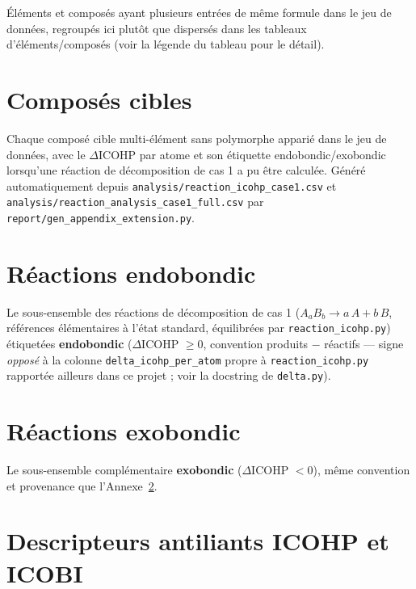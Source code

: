 \documentclass[11pt,a4paper]{article}
\begin{document}
Éléments et composés ayant plusieurs entrées de même formule dans le
jeu de données, regroupés ici plutôt que dispersés dans les tableaux
d'éléments/composés (voir la légende du tableau pour le détail).

{\small

}

\section{Composés cibles}
\label{sec:appendix-ext-compounds}

Chaque composé cible multi-élément sans polymorphe apparié dans le jeu
de données, avec le $\Delta$ICOHP par atome et son étiquette
endobondic/exobondic lorsqu'une réaction de décomposition de cas 1 a pu
être calculée. Généré automatiquement depuis
\texttt{analysis/reaction\_icohp\_case1.csv} et
\texttt{analysis/reaction\_analysis\_case1\_full.csv} par
\texttt{report/gen\_appendix\_extension.py}.

{\small

}

\section{Réactions endobondic}
\label{sec:appendix-ext-endobondic}

Le sous-ensemble des réactions de décomposition de cas 1
($A_aB_b \to a\,A + b\,B$, références élémentaires à l'état standard,
équilibrées par \texttt{reaction\_icohp.py}) étiquetées
\textbf{endobondic} ($\Delta$ICOHP $\geq 0$, convention produits $-$
réactifs --- signe \emph{opposé} à la colonne
\texttt{delta\_icohp\_per\_atom} propre à \texttt{reaction\_icohp.py}
rapportée ailleurs dans ce projet ; voir la docstring de
\texttt{delta.py}).

{\small

}

\section{Réactions exobondic}
\label{sec:appendix-ext-exobondic}

Le sous-ensemble complémentaire \textbf{exobondic} ($\Delta$ICOHP $< 0$),
même convention et provenance que l'Annexe~\ref{sec:appendix-ext-endobondic}.

{\small

}

\section{Descripteurs antiliants ICOHP et ICOBI}
\label{sec:appendix-icobi-antibonding}
\end{document}

